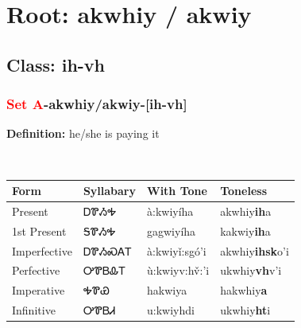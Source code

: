 \needspace{4in}
\section*{Root: akwhiy / akwiy}
\nopagebreak
{}
\needspace{3in}
\subsection*{Class: ih-vh}
\nopagebreak
\needspace{2in}
\subsubsection*{\textcolor{Red}{Set A}{-}\textbf{akwhiy/akwiy}{-}[ih-vh]}
\nopagebreak
\textbf{Definition: } he/she is paying it
\\[0.5em]
\begin{tabularx}{\textwidth}{l X X X}%
\toprule%
\textbf{Form}&\textbf{Syllabary}&\textbf{With Tone}&\textbf{Toneless}\\%
\midrule%
Present&ᎠᏈᏱᎭ&à:kwiyíha&akwhiy\textbf{ih}a\\%
1st Present&ᎦᏈᏱᎭ&gagwiyíha&kakwiy\textbf{ih}a\\%
Imperfective&ᎠᏈᏱᏍᎪᎢ&à:kwiyǐ:sgó’i&akwhiy\textbf{ihsk}o'i\\%
Perfective&ᎤᏈᏴᎲᎢ&ù:kwiyv:hv̌:’i&ukwhiy\textbf{vh}v'i\\%
Imperative&ᎭᏈᏯ&hakwiya&hakwhiy\textbf{a}\\%
Infinitive&ᎤᏈᏴᏗ&u:kwiyhdi&ukwhiy\textbf{ht}i\\%
\bottomrule%
\end{tabularx}
\\[1em]